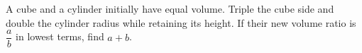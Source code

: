 A cube and a cylinder initially have equal volume. Triple the cube side and double the cylinder radius while retaining its height. If their new volume ratio is $\dfrac{a}{b}$ in lowest terms, find $a+b$.
